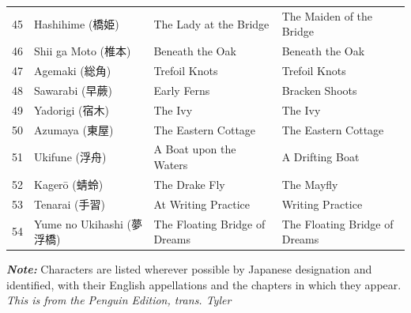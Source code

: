 \documentclass{article}
\begin{document}
\begin{table}
\begin{tabular}{llll}
		45          & Hashihime (橋姫)         & The Lady at the Bridge              & The Maiden of the Bridge      \\
		46          & Shii ga Moto (椎本)      & Beneath the Oak                     & Beneath the Oak               \\
		47          & Agemaki (総角)           & Trefoil Knots                       & Trefoil Knots                 \\
		48          & Sawarabi (早蕨)          & Early Ferns                         & Bracken Shoots                \\
		49          & Yadorigi (宿木)          & The Ivy                             & The Ivy                       \\
		50          & Azumaya (東屋)           & The Eastern Cottage                 & The Eastern Cottage           \\
		51          & Ukifune (浮舟)           & A Boat upon the Waters              & A Drifting Boat               \\
		52          & Kagerō (蜻蛉)            & The Drake Fly                       & The Mayfly                    \\
		53          & Tenarai (手習)           & At Writing Practice                 & Writing Practice              \\
		54          & Yume no Ukihashi (夢浮橋) & The Floating Bridge of Dreams       & The Floating Bridge of Dreams \\
	\end{tabular}
\end{table}



\clearpage




\noindent \textbf{\textit{Note:}} Characters are listed wherever possible by Japanese designation and identified, with their English appellations and the chapters in which they appear. \textit{This is from the Penguin Edition, trans. Tyler}
\end{document}
